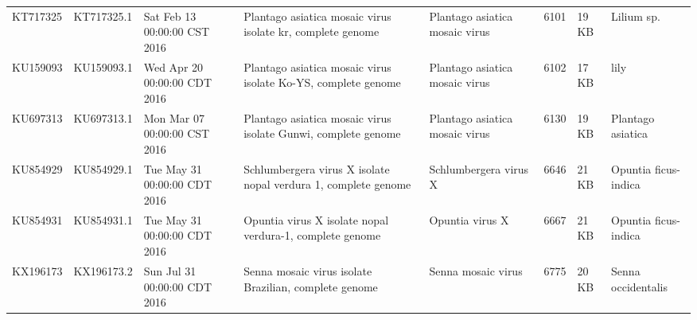 \documentclass[11pt]{article}
\begin{document}
\begin{supptable}[ht]
{\begin{tabular}{@{}llllllll@{}}
KT717325 & KT717325.1 & Sat Feb 13 00:00:00 CST 2016 & Plantago asiatica mosaic virus isolate kr, complete genome                                                                                                                                                                                                       & Plantago asiatica mosaic virus & 6101            & 19 KB & Lilium sp.                            \\
KU159093 & KU159093.1 & Wed Apr 20 00:00:00 CDT 2016 & Plantago asiatica mosaic virus isolate Ko-YS, complete genome                                                                                                                                                                                                    & Plantago asiatica mosaic virus & 6102            & 17 KB & lily                                  \\
KU697313 & KU697313.1 & Mon Mar 07 00:00:00 CST 2016 & Plantago asiatica mosaic virus isolate Gunwi, complete genome                                                                                                                                                                                                    & Plantago asiatica mosaic virus & 6130            & 19 KB & Plantago asiatica                     \\
KU854929 & KU854929.1 & Tue May 31 00:00:00 CDT 2016 & Schlumbergera virus X isolate nopal verdura 1, complete genome                                                                                                                                                                                                   & Schlumbergera virus X          & 6646            & 21 KB & Opuntia ficus-indica                  \\
KU854931 & KU854931.1 & Tue May 31 00:00:00 CDT 2016 & Opuntia virus X isolate nopal verdura-1, complete genome                                                                                                                                                                                                         & Opuntia virus X                & 6667            & 21 KB & Opuntia ficus-indica                  \\
KX196173 & KX196173.2 & Sun Jul 31 00:00:00 CDT 2016 & Senna mosaic virus isolate Brazilian, complete genome                                                                                                                                                                                                            & Senna mosaic virus             & 6775            & 20 KB & Senna occidentalis                    \\

\end{tabular}}
\end{supptable}
\end{document}
